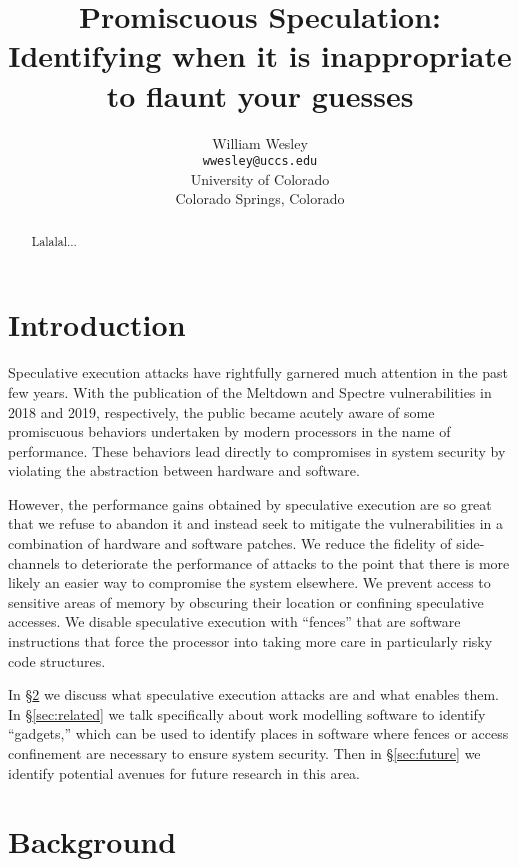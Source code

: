\documentclass[11pt,conference]{IEEEtran}
\title{Promiscuous Speculation: Identifying when it is inappropriate to flaunt your guesses}
\author{William Wesley \\
\texttt{wwesley@uccs.edu} \\
University of Colorado \\
Colorado Springs, Colorado}
\begin{document}
\maketitle

\begin{abstract}
Lalalal...
\end{abstract}

\section{Introduction}

Speculative execution attacks have rightfully garnered much attention in the past few years.
With the publication of the Meltdown\cite{meltdown} and Spectre\cite{spectre} vulnerabilities in 2018 and 2019, respectively, the public became acutely aware of some promiscuous behaviors undertaken by modern processors in the name of performance.
These behaviors lead directly to compromises in system security by violating the abstraction between hardware and software.

However, the performance gains obtained by speculative execution are so great that we refuse to abandon it and instead seek to mitigate the vulnerabilities in a combination of hardware and software patches.
We reduce the fidelity of side-channels to deteriorate the performance of attacks to the point that there is more likely an easier way to compromise the system elsewhere.
We prevent access to sensitive areas of memory by obscuring their location or confining speculative accesses.
We disable speculative execution with ``fences'' that are software instructions that force the processor into taking more care in particularly risky code structures.

In \S\ref{sec:background} we discuss what speculative execution attacks are and what enables them.
In \S\ref{sec:related} we talk specifically about work modelling software to identify ``gadgets,'' which can be used to identify places in software where fences or access confinement are necessary to ensure system security.
Then in \S\ref{sec:future} we identify potential avenues for future research in this area.

\section{Background}\label{sec:background}
\end{document}

